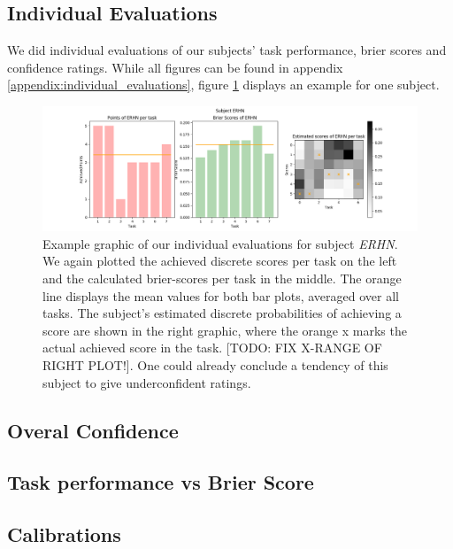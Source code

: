 \documentclass[../main/main.tex]{subfiles}
\begin{document}
\subsection{Individual Evaluations}
We did individual evaluations of our subjects' task performance, brier scores and confidence ratings. While all figures can be found in appendix \ref{appendix:individual_evaluations}, figure \ref{fig:erhn_results} displays an example for one subject.
\begin{figure}[h]
	\centering
	\captionsetup{justification=centering}
	\includegraphics[width=\textwidth]{../assets/ERHN_results.png}
	\caption{Example graphic of our individual evaluations for subject \textit{ERHN}. We again plotted the achieved discrete scores per task on the left and the calculated brier-scores per task in the middle. The orange line displays the mean values for both bar plots, averaged over all tasks. The subject's estimated discrete probabilities of achieving a score are shown in the right graphic, where the orange x marks the actual achieved score in the task. [TODO: FIX X-RANGE OF RIGHT PLOT!]. One could already conclude a tendency of this subject to give underconfident ratings.}
	\label{fig:erhn_results} 
\end{figure}
\subsection{Overal Confidence}
\subsection{Task performance vs Brier Score}
\subsection{Calibrations}
\end{document}

